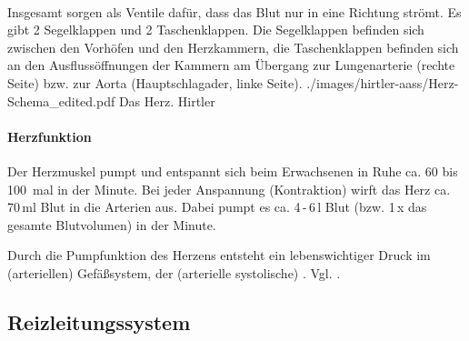 ~


{%
%
%
%
%
Insgesamt  sorgen als Ventile dafür, dass das Blut nur in eine Richtung
strömt. Es gibt 2 Segelklappen und 2 Taschenklappen. Die Segelklappen befinden
sich zwischen den Vorhöfen und den Herzkammern, die Taschenklappen befinden sich an den
Ausflussöffnungen der Kammern am Übergang zur Lungenarterie (rechte
Seite) bzw. zur  Aorta (Hauptschlagader, linke Seite). 
}
{}
{./images/hirtler-aass/Herz-Schema_edited.pdf}
{Das Herz.}
{Hirtler}







 


\paragraph{Herzfunktion}\label{topic:herzfunktion}

Der Herzmuskel pumpt und entspannt sich beim Erwachsenen
in Ruhe ca. 60 bis 100~mal in der Minute. Bei jeder
Anspannung (Kontraktion) wirft das Herz ca. 70\,ml Blut in die Arterien
aus. Dabei pumpt es ca. 4\,-\,6\,l  Blut (bzw. 1\,x das
gesamte Blutvolumen) in der Minute.

Durch die Pumpfunktion des Herzens entsteht ein
lebenswichtiger Druck im (arteriellen) Gefäßsystem, der
(arterielle systolische)  .
Vgl. . 

%
%
\subsection{Reizleitungssystem}


